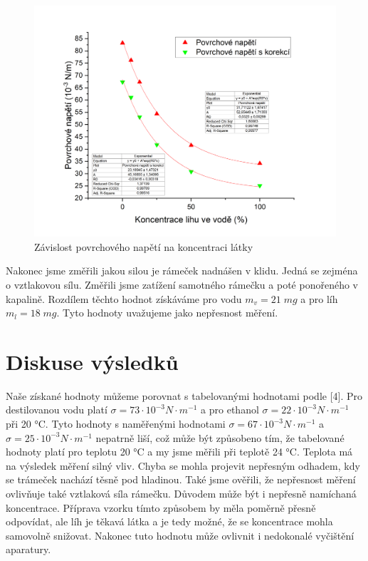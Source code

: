 \begin{figure}[H]
    \centering
    \includegraphics[width=1\linewidth]{4 - Závislost povrchového napětí na koncentraci povrchově aktivní látky//Protokol_povrchové napětí//img/Závislost povrchového napětí na koncentraci.png}
    \caption{Závislost povrchového napětí na koncentraci látky}
    \label{fig:zavislost-napeti}
\end{figure}

\newpage

Nakonec jsme změřili jakou silou je rámeček nadnášen v klidu. Jedná se zejména o vztlakovou sílu. Změřili jsme zatížení samotného rámečku a poté ponořeného v kapalině. Rozdílem těchto hodnot získáváme pro vodu $m_v = 21 \; mg$ a pro líh $m_l = 18 \; mg$. Tyto hodnoty uvažujeme jako nepřesnost měření.

\newpage

\section{Diskuse výsledků}

Naše získané hodnoty můžeme porovnat s tabelovanými hodnotami podle [4]. Pro destilovanou vodu platí $\sigma = 73 \cdot 10^{-3} N \cdot m ^{-1}$ a pro ethanol $\sigma = 22 \cdot 10^{-3} N \cdot m^{-1}$ při 20 °C. Tyto hodnoty s naměřenými hodnotami $\sigma = 67 \cdot 10^{-3} N \cdot m ^{-1}$ a $\sigma = 25 \cdot 10^{-3} N \cdot m^{-1}$ nepatrně liší, což může být způsobeno tím, že tabelované hodnoty platí pro teplotu 20 °C a my jsme měřili při teplotě 24 °C. Teplota má na výsledek měření silný vliv. Chyba se mohla projevit nepřesným odhadem, kdy se trámeček nachází těsně pod hladinou. Také jsme ověřili, že nepřesnost měření ovlivňuje také vztlaková síla rámečku. Důvodem může být i nepřesně namíchaná koncentrace. Příprava vzorku tímto způsobem by měla poměrně přesně odpovídat, ale líh je těkavá látka a je tedy možné, že se koncentrace mohla samovolně snižovat. Nakonec tuto hodnotu může ovlivnit i nedokonalé vyčištění aparatury.


